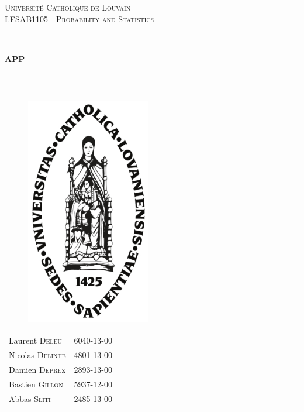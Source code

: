 \documentclass[a4paper]{article}
\begin{document}
\begin{titlepage}
\newcommand{\HRule}{\rule{\linewidth}{0.5mm}} 
\center 
\textsc{\Large Universit\'e Catholique de Louvain}\\[1cm] 
\textsc{\LARGE LFSAB1105 - Probability and Statistics}\\[0.5cm] 

\HRule \\[0.4cm]
{ \huge \bfseries APP}\\ [0.4cm]
\HRule \\[0.1cm]
\vspace{1cm}
\begin{figure}[ht]
\centering
\includegraphics [height=10cm] {img/ucl}
\end{figure}
\vspace{1cm}
\begin{minipage}{0.7\textwidth}
\begin{center}
\begin{tabular}{lc}
Laurent \textsc{Deleu} & 6040-13-00 \\
Nicolas \textsc{Delinte} & 4801-13-00\\
Damien \textsc{Deprez} & 2893-13-00 \\
Bastien \textsc{Gillon} & 5937-12-00\\
Abbas \textsc{Sliti} & 2485-13-00\\

\end{tabular}
\end{center}

\end{minipage}\\[1cm]


\end{titlepage}
\end{document}
